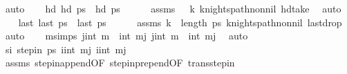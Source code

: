 \begin{isabellebody}
\ auto\isanewline
\isanewline
\ \ \isamarkupfalse%
\ hd{\isacharcolon}{\kern0pt}\ {\isachardoublequoteopen}hd\ {\isacharquery}{\kern0pt}ps\ {\isacharequal}{\kern0pt}\ hd\ ps\isanewline
\ \ \ \ \isamarkupfalse%
\ assms\ {\isacartoucheopen}{}\ {\isacharless}{\kern0pt}\ k{\isacartoucheclose}\ knights{\isacharunderscore}{\kern0pt}path{\isacharunderscore}{\kern0pt}non{\isacharunderscore}{\kern0pt}nil\ hd{\isacharunderscore}{\kern0pt}take\ \isamarkupfalse%
\ auto\isanewline
\isanewline
\ \ \isamarkupfalse%
\ last{\isacharcolon}{\kern0pt}\ {\isachardoublequoteopen}last\ {\isacharquery}{\kern0pt}ps\ {\isacharequal}{\kern0pt}\ last\ ps\isanewline
\ \ \ \ \isamarkupfalse%
\ assms\ {\isacartoucheopen}k\ {\isacharless}{\kern0pt}\ length\ ps\ knights{\isacharunderscore}{\kern0pt}path{\isacharunderscore}{\kern0pt}non{\isacharunderscore}{\kern0pt}nil\ last{\isacharunderscore}{\kern0pt}drop\ \isamarkupfalse%
\ auto\isanewline
\isanewline
\ \ \isamarkupfalse%
\ m{\isacharunderscore}{\kern0pt}simps{\isacharcolon}{\kern0pt}\ {\isachardoublequoteopen}j{\isacharplus}{\kern0pt}int\ m\ {\isacharequal}{\kern0pt}\ int\ mj{\isachardoublequoteclose}\ {\isachardoublequoteopen}j{\isacharprime}{\kern0pt}{\isacharplus}{\kern0pt}int\ m\ {\isacharequal}{\kern0pt}\ int\ mj{\isacharprime}{\kern0pt}{\isachardoublequoteclose}\ \isamarkupfalse%
\ auto\isanewline
\ \ \isamarkupfalse%
\ si{\isacharcolon}{\kern0pt}\ {\isachardoublequoteopen}step{\isacharunderscore}{\kern0pt}in\ {\isacharquery}{\kern0pt}ps\ {\isacharparenleft}{\kern0pt}i{\isacharcomma}{\kern0pt}int\ mj{\isacharparenright}{\kern0pt}\ {\isacharparenleft}{\kern0pt}i{\isacharprime}{\kern0pt}{\isacharcomma}{\kern0pt}int\ mj{\isacharprime}{\kern0pt}{\isacharparenright}{\kern0pt}{\isachardoublequoteclose}\isanewline
\ \ \ \ \isamarkupfalse%
\ assms\ step{\isacharunderscore}{\kern0pt}in{\isacharunderscore}{\kern0pt}append{\isacharbrackleft}{\kern0pt}OF\ step{\isacharunderscore}{\kern0pt}in{\isacharunderscore}{\kern0pt}prepend{\isacharbrackleft}{\kern0pt}OF\ trans{\isacharunderscore}{\kern0pt}step{\isacharunderscore}{\kern0pt}in{\isacharbrackright}{\kern0pt}{\isacharcomma}{\kern0pt}\ \isanewline

\end{isabellebody}
